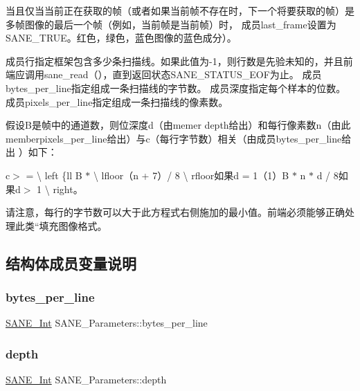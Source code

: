 当且仅当当前正在获取的帧（或者如果当前帧不存在时，下一个将要获取的帧）是多帧图像的最后一个帧（例如，当前帧是当前帧）时， 成员last\+\_\+frame设置为\+S\+A\+N\+E\+\_\+\+T\+R\+U\+E。红色，绿色，蓝色图像的蓝色成分）。

成员行指定框架包含多少条扫描线。如果此值为-\/1，则行数是先验未知的，并且前端应调用sane\+\_\+read（），直到返回状态\+S\+A\+N\+E\+\_\+\+S\+T\+A\+T\+U\+S\+\_\+\+E\+O\+F为止。 成员bytes\+\_\+per\+\_\+line指定组成一条扫描线的字节数。 成员深度指定每个样本的位数。 成员pixels\+\_\+per\+\_\+line指定组成一条扫描线的像素数。

假设\+B是帧中的通道数，则位深度d（由memer depth给出）和每行像素数n（由此memberpixels\+\_\+per\+\_\+line给出）与c（每行字节数）相关（由成员bytes\+\_\+per\+\_\+line给出 ）如下：

c$>$ = \textbackslash{} left \{ll B $\ast$ \textbackslash{} lfloor（n + 7）/ 8 \textbackslash{} rfloor如果d = 1（1）B $\ast$ n $\ast$ d / 8如果d$>$ 1 \textbackslash{} right。

请注意，每行的字节数可以大于此方程式右侧施加的最小值。前端必须能够正确处理此类``填充\textquotesingle{}\textquotesingle{}图像格式。 

\subsection{结构体成员变量说明}
\mbox{\label{structSANE__Parameters_aca06c63a777ef5a377fd59455c2e6dcf}} 
\subsubsection{\texorpdfstring{bytes\+\_\+per\+\_\+line}{bytes\_per\_line}}
{\footnotesize\ttfamily \hyperlink{sane_8h_a18b0de32eae6997909ae9ab0117af3d5}{S\+A\+N\+E\+\_\+\+Int} S\+A\+N\+E\+\_\+\+Parameters\+::bytes\+\_\+per\+\_\+line}

\mbox{\label{structSANE__Parameters_a96226ce43f21e11bffb86e7ddb170d65}} 
\subsubsection{\texorpdfstring{depth}{depth}}
{\footnotesize\ttfamily \hyperlink{sane_8h_a18b0de32eae6997909ae9ab0117af3d5}{S\+A\+N\+E\+\_\+\+Int} S\+A\+N\+E\+\_\+\+Parameters\+::depth}

